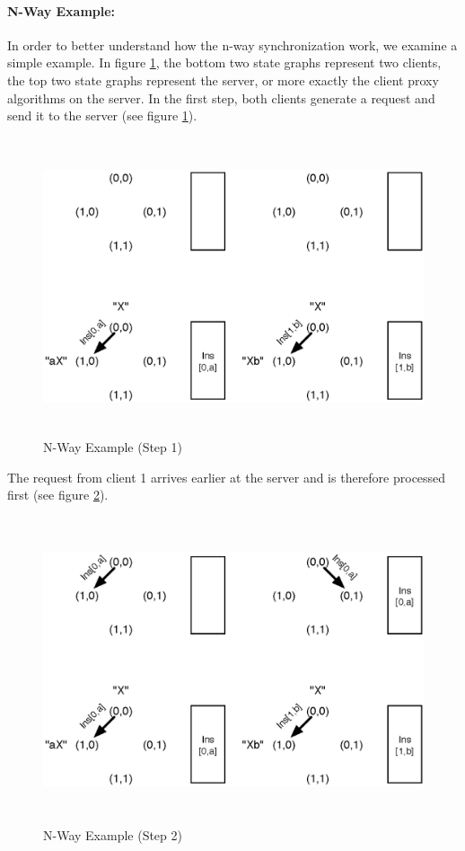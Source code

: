 \paragraph{N-Way Example:} In order to better understand how the n-way synchronization work, we examine a simple example. In figure \ref{fig:concepts.nway-example-1}, the bottom two state graphs represent two clients, the top two state graphs represent the server, or more exactly the client proxy algorithms on the server. In the first step, both clients generate a request and send it to the server (see figure \ref{fig:concepts.nway-example-1}).

\begin{figure}[H]
 \centering
 \includegraphics[width=14.5cm,height=8.75cm]{../../images/concepts_nway-example-1.eps}
 \caption{N-Way Example (Step 1)}
 \label{fig:concepts.nway-example-1}
\end{figure}

The request from client 1 arrives earlier at the server and is therefore processed first (see figure \ref{fig:concepts.nway-example-2}).

\begin{figure}[H]
 \centering
 \includegraphics[width=14.5cm,height=9.0cm]{../../images/concepts_nway-example-2.eps}
 \caption{N-Way Example (Step 2)}
 \label{fig:concepts.nway-example-2}
\end{figure}

